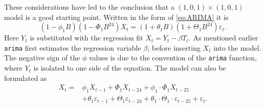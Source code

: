 \noindent These considerations have led to the conclusion that a $(1,0,1)\times (1,0,1)$ model is a good starting point. Written in the form of \cref{eq:ARIMA} it is
\begin{equation}
    (1-\phi_1 B)(1-\Phi_1 B^{24})X_t = (1+\theta_1 B)(1+\Theta_1 B^{24}) \varepsilon_t. \label{eq:model1}
\end{equation}
Here $Y_t$ is substituted with the regression fit $X_t = Y_t -\beta T_t$. As mentioned earlier \texttt{arima} first estimates the regression variable $\beta$, before inserting $X_t$ into the model. The negative sign of the $\phi$ values is due to the convention of the \texttt{arima} function, where $Y_t$ is isolated to one side of the equation. The model can also be formulated as
\begin{align}
    X_t = &\phi_1 X_{t-1} + \Phi_1 X_{t-24} + \phi_1 \cdot \Phi_1  X_{t-25}\nonumber\\  &+ \theta_1 \varepsilon_{t-1} + \Theta_1 \varepsilon_{t-24} + \theta_1 \cdot \Theta_1 \cdot \varepsilon_{t-25} + \varepsilon_t.
\end{align}

